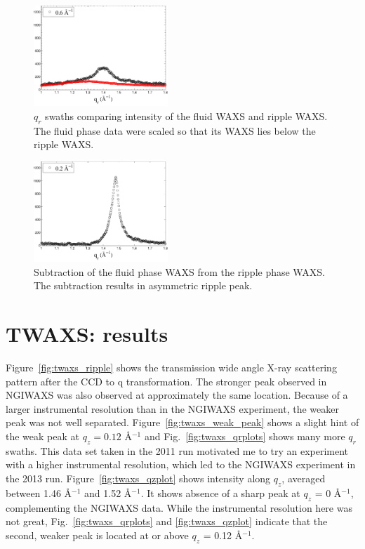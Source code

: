 \begin{figure}[htbp]
  \includegraphics[width=0.45\textwidth]{figures/ripple/NGIWAXS/qr_fluid&ripple5}
  \caption{$q_r$ swaths comparing intensity of the fluid WAXS and ripple WAXS.
  The fluid phase data were scaled so that its WAXS lies below the ripple WAXS.}
  \label{fig:fluid&ripple}
\end{figure}

\begin{figure}[htbp]
  \centering
  \includegraphics[width=0.45\textwidth]{figures/ripple/NGIWAXS/qr_ripple-fluid}
  \caption{Subtraction of the fluid phase WAXS from the ripple phase
  WAXS. The subtraction results in asymmetric ripple peak.}
  \label{fig:ripple-fluid}
\end{figure}

\newpage
\section{TWAXS: results}\label{sec:TWAXS_results}
Figure~\ref{fig:twaxs_ripple} shows the transmission wide angle X-ray
scattering pattern after the CCD to q transformation. The stronger
peak observed in NGIWAXS was also observed at approximately the same location.
Because of a larger instrumental resolution than in the NGIWAXS experiment,
the weaker peak was not well separated. Figure~\ref{fig:twaxs_weak_peak} shows
a slight hint of the weak peak at $q_z=0.12$ \AA$^{-1}$ and 
Fig.~\ref{fig:twaxs_qrplots} shows many more $q_r$ swaths. This
data set taken in the 2011 run motivated me to try an experiment
with a higher instrumental resolution, which led to the NGIWAXS experiment
in the 2013 run. Figure~\ref{fig:twaxs_qzplot} shows intensity along $q_z$,
averaged between 1.46 \AA$^{-1}$ and 1.52 \AA$^{-1}$. It shows absence of
a sharp peak at $q_z$ = 0 \AA$^{-1}$, complementing the NGIWAXS data.
While the instrumental resolution here was not great, 
Fig.~\ref{fig:twaxs_qrplots} and \ref{fig:twaxs_qzplot} indicate
that the second, weaker peak is located at or above $q_z$ = 0.12 \AA$^{-1}$.

